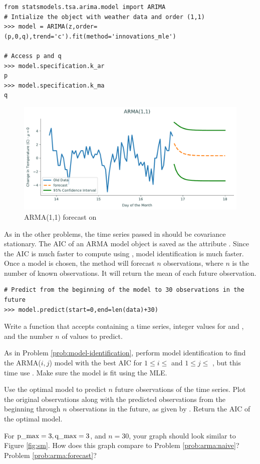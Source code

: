\begin{lstlisting}
from statsmodels.tsa.arima.model import ARIMA
# Intialize the object with weather data and order (1,1)
>>> model = ARIMA(z,order=(p,0,q),trend='c').fit(method='innovations_mle')

# Access p and q
>>> model.specification.k_ar
p
>>> model.specification.k_ma
q
\end{lstlisting}

\begin{figure}
\centering
\includegraphics[width=\textwidth]{figures/arma.pdf}
\caption{ARMA(1,1) forecast on }
\label{fig:forecasted}
\end{figure}

As in the other problems, the time series passed in should be covariance stationary.
The AIC of an ARMA model object is saved as the attribute .
Since the AIC is much faster to compute using , model identification is much faster.
Once a model is chosen, the method  will forecast $n$ observations, where $n$ is the number of known observations.
It will return the mean of each future observation.

\begin{lstlisting}
# Predict from the beginning of the model to 30 observations in the future
>>> model.predict(start=0,end=len(data)+30)
\end{lstlisting}

\begin{problem}
Write a function  that accepts  containing a time series, integer values for  and , and the number $n$ of values to predict.

As in Problem \ref{prob:model-identification}, perform model identification to find the ARMA($i,j$) model with the best AIC for $1\leq i \leq$  and $1 \leq j \leq$ , but this time use .
Make sure the model is fit using the MLE.

Use the optimal model to predict $n$ future observations of the time series.
Plot the original observations along with the predicted observations from the beginning through $n$ observations in the future, as given by .
Return the AIC of the optimal model.

For $\text{\li{p_max}}=3, \text{\li{q_max}}=3$, and $n=30$, your graph should look similar to Figure \ref{fig:sm}.
How does this graph compare to Problem \ref{prob:arma:naive}? Problem \ref{prob:arma:forecast}?
\label{prob:statsmodels}
\end{problem}

